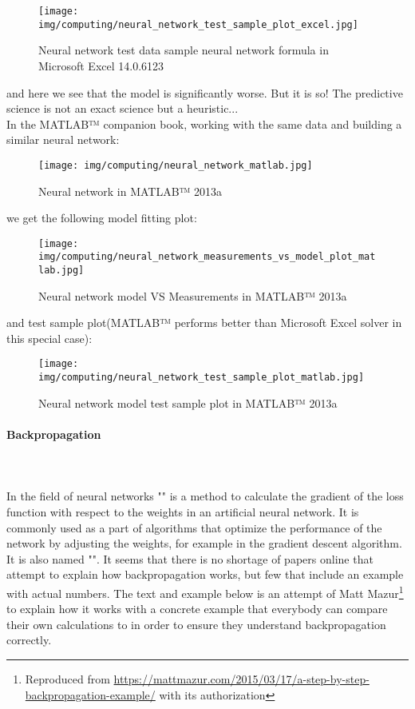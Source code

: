 	\begin{tcolorbox}[colframe=black,colback=white,sharp corners]
	\begin{figure}[H]
		\centering
		\texttt{[image: img/computing/neural\_network\_test\_sample\_plot\_excel.jpg]}
		\caption[]{Neural network test data sample neural network formula in Microsoft Excel 14.0.6123}
	\end{figure}
	and here we see that the model is significantly worse. But it is so! The predictive science is not an exact science but a heuristic...\\
	
	In the MATLAB™ companion book, working with the same data and building a similar neural network:
	\begin{figure}[H]
		\centering
		\texttt{[image: img/computing/neural\_network\_matlab.jpg]}
		\caption{Neural network in MATLAB™ 2013a}
	\end{figure}
	we get the following model fitting plot:
	\end{tcolorbox}
	
	\begin{tcolorbox}[colframe=black,colback=white,sharp corners]
	\begin{figure}[H]
		\centering
		\texttt{[image: img/computing/neural\_network\_measurements\_vs\_model\_plot\_matlab.jpg]}
		\caption[]{Neural network model VS Measurements in MATLAB™  2013a}
	\end{figure}
	and test sample plot(MATLAB™ performs better than Microsoft Excel solver in this special case):
	\begin{figure}[H]
		\centering
		\texttt{[image: img/computing/neural\_network\_test\_sample\_plot\_matlab.jpg]}
		\caption[]{Neural network model test sample plot in MATLAB™  2013a}
	\end{figure}
	\end{tcolorbox}
	 
	 \paragraph{Backpropagation}\mbox{}\\\\
	 In the field of neural networks "" is a method to calculate the gradient of the loss function with respect to the weights in an artificial neural network. It is commonly used as a part of algorithms that optimize the performance of the network by adjusting the weights, for example in the gradient descent algorithm. It is also named "". It seems that there is no shortage of papers online that attempt to explain how backpropagation works, but few that include an example with actual numbers. The text and example below is an attempt of Matt Mazur\footnote{Reproduced from \url{https://mattmazur.com/2015/03/17/a-step-by-step-backpropagation-example/} with its authorization} to explain how it works with a concrete example that everybody can compare their own calculations to in order to ensure they understand backpropagation correctly.

